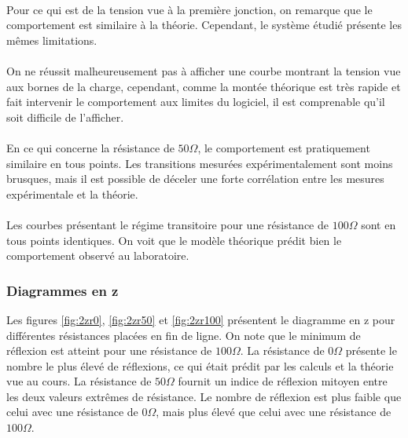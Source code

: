 \paragraph{}Pour ce qui est de la tension vue à la première jonction, on remarque que le comportement est similaire à la théorie. Cependant, le système étudié présente les mêmes limitations. 

\paragraph{}On ne réussit malheureusement pas à afficher une courbe montrant la tension vue aux bornes de la charge, cependant, comme la montée théorique est très rapide et fait intervenir le comportement aux limites du logiciel, il est comprenable qu'il soit difficile de l'afficher. 

\paragraph{}En ce qui concerne la résistance de $50\Omega$, le comportement est pratiquement similaire en tous points. Les transitions mesurées expérimentalement sont moins brusques, mais il est possible de déceler une forte corrélation entre les mesures expérimentale et la théorie. 

\paragraph{}Les courbes présentant le régime transitoire pour une résistance de $100\Omega$ sont en tous points identiques. On voit que le modèle théorique prédit bien le comportement observé au laboratoire. 
\subsubsection{Diagrammes en z}

Les figures \ref{fig:2zr0}, \ref{fig:2zr50} et \ref{fig:2zr100} présentent le diagramme en z pour différentes résistances placées en fin de ligne. On note que le minimum de réflexion est atteint pour une résistance de $100\Omega$. La résistance de $0\Omega$ présente le nombre le plus élevé de réflexions, ce qui était prédit par les calculs et la théorie vue au cours. La résistance de $50\Omega$ fournit un indice de réflexion mitoyen entre les deux valeurs extrêmes de résistance. Le nombre de réflexion est plus faible que celui avec une résistance de $0\Omega$, mais plus élevé que celui avec une résistance de $100\Omega$. 
\clearpage
\newpage
